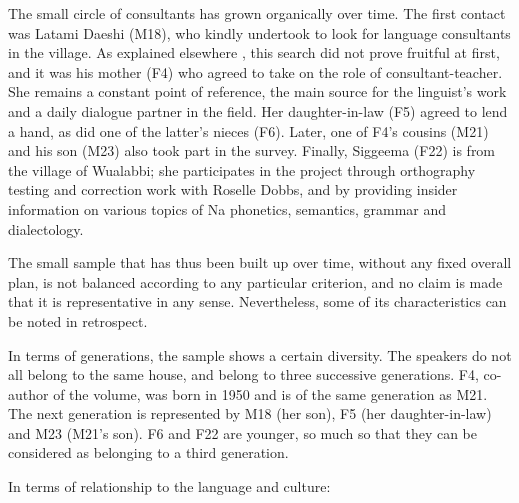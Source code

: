 The small circle of consultants has grown organically over time. The first contact was Latami Daeshi (M18), who kindly undertook to look for language consultants in the village. As explained elsewhere \parencite[28-29]{michaud2017}, this search did not prove fruitful at first, and it was his mother (F4) who agreed to take on the role of consultant-teacher. She remains a constant point of reference, the main source for the linguist's work and a daily dialogue partner in the field. Her daughter-in-law (F5) agreed to lend a hand, as did one of the latter's nieces (F6). Later, one of F4's cousins (M21) and his son (M23) also took part in the survey.
Finally, Siggeema (F22) is from the village of Wualabbi; she participates in the project through orthography testing and correction work with Roselle Dobbs, and by providing insider information on various topics of Na phonetics, semantics, grammar and dialectology.

The small sample that has thus been built up over time, without any fixed overall plan, is not balanced according to any particular criterion, and no claim is made that it is representative in any sense. Nevertheless, some of its characteristics can be noted in retrospect.

In terms of generations, the sample shows a certain diversity. The speakers do not all belong to the same house, and belong to three successive generations. F4, co-author of the volume, was born in 1950 and is of the same generation as M21. The next generation is represented by M18 (her son), F5 (her daughter-in-law) and M23 (M21's son). F6 and F22 are younger, so much so that they can be considered as belonging to a third generation.

In terms of relationship to the language and culture:

